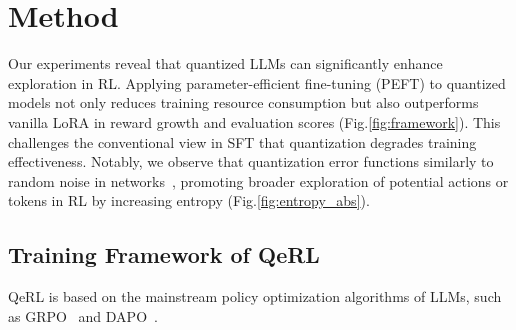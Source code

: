 \section{Method}\label{method}

Our experiments reveal that quantized LLMs can significantly enhance exploration in RL. Applying parameter-efficient fine-tuning (PEFT) to quantized models not only reduces training resource consumption but also outperforms vanilla LoRA in reward growth and evaluation scores (Fig.\ref{fig:framework}). This challenges the conventional view in SFT that quantization degrades training effectiveness\citep{qlora, guo2023lq}. Notably, we observe that quantization error functions similarly to random noise in networks~\citep{plappert2017parameter, eberhard2023pink,osband2016deep}, promoting broader exploration of potential actions or tokens in RL by increasing entropy (Fig.\ref{fig:entropy_abs}).



\subsection{Training Framework of QeRL}
QeRL is based on the mainstream policy optimization algorithms of LLMs, such as GRPO~\citep{grpo} and DAPO~\citep{dapo}.

